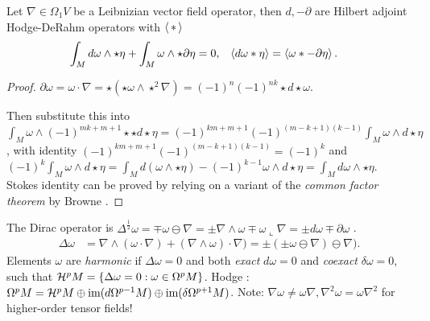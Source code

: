 \documentclass{juliacon}
\begin{document}
\begin{theorem}
	Let $ \nabla \in\Omega_1 V $ be a Leibnizian vector field operator, then $d,-\partial$ are Hilbert adjoint Hodge-DeRahm operators with $\left\langle \,\ast\, \right\rangle$
	\begin{align*}
		\int_M d\omega\wedge\star\eta +\int_M \omega\wedge\star\partial\eta &= 0, & \left\langle d\omega\ast\eta \right\rangle &=\left\langle \omega\ast-\partial\eta \right\rangle.
	\end{align*}
\end{theorem}
\begin{proof}
	$\partial\omega = \omega\cdot\nabla = \star(\star\omega\wedge\star^2\nabla) = (-1)^n(-1)^{nk}\star d\star\omega$.


	Then  substitute this into $\int_M \omega\wedge(-1)^{mk+m+1}\star\star d\star\eta = (-1)^{km+m+1}(-1)^{(m-k+1)(k-1)}\int_M\omega\wedge d\star\eta$,
	with identity $(-1)^{km+m+1}(-1)^{(m-k+1)(k-1)}=(-1)^k$ and
	$ (-1)^k\int_M\omega\wedge d\star\eta = \int_M d(\omega\wedge\star\eta) - (-1)^{k-1}\omega\wedge d\star\eta = \int_M d\omega\wedge\star\eta$.
	Stokes identity can be proved by relying on a variant of the \textit{common factor theorem} by Browne \cite{browne}.
\end{proof}
\begin{theorem}
	The Dirac operator is $ \Delta^\frac12\omega = \mp\omega\ominus\nabla = \pm\nabla\wedge\omega \mp \omega\llcorner\nabla  = \pm d\omega\mp\partial\omega$ \cite{garling}.
	\begin{align*}
		\Delta\omega &= \nabla\wedge(\omega\cdot\nabla) + (\nabla\wedge\omega)\cdot\nabla) = \pm(\pm\omega\ominus\nabla)\ominus\nabla).
	\end{align*}
	Elements $\omega$ are \textit{harmonic} if $\Delta\omega = 0$ and both \textit{exact} $d\omega=0$ and \textit{coexact} $\delta\omega=0$, such that $\mathcal{H}^p M = \left\{ \Delta\omega = 0 : \omega\in \Omega^pM \right\}$.
	Hodge \cite{ivancevic}:
	$\Omega^pM=\mathcal{H}^pM\oplus\text{im}(d\Omega^{p-1}M)\oplus\text{im}(\delta\Omega^{p+1}M)$.
	Note: $\nabla\omega\neq\omega\nabla, \nabla^2\omega=\omega\nabla^2$ for higher-order tensor fields!
\end{theorem}

\end{document}
